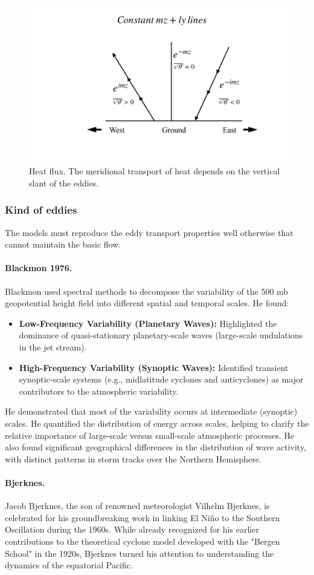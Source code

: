 \begin{figure}[htp!]
	\centering
	\includegraphics[width=0.5\linewidth]{uploads/Screenshot 2024-11-24 185505.png}
	\caption{Heat flux. The meridional transport of heat depends on the vertical slant of the eddies.}
	\label{fig:enter-label}
\end{figure}
\subsubsection{Kind of eddies}
The models must reproduce the eddy transport properties well otherwise that cannot maintain the basic flow.
\paragraph{Blackmon 1976.}\cite{Black76} Blackmon used spectral methods to decompose the variability of the 500 mb geopotential height field into different spatial and temporal scales. He found:
\begin{itemize}
	\item \textbf{Low-Frequency Variability (Planetary Waves):} Highlighted the dominance of quasi-stationary planetary-scale waves (large-scale undulations in the jet stream).
	\item \textbf{High-Frequency Variability (Synoptic Waves):} Identified transient synoptic-scale systems (e.g., midlatitude cyclones and anticyclones) as major contributors to the atmospheric variability.
\end{itemize}
He demonstrated that most of the variability occurs at intermediate (synoptic) scales. He quantified the distribution of energy across scales, helping to clarify the relative importance of large-scale versus small-scale atmospheric processes. He also found significant geographical differences in the distribution of wave activity, with distinct patterns in storm tracks over the Northern Hemisphere.

\paragraph{Bjerknes.} Jacob Bjerknes, the son of renowned meteorologist Vilhelm Bjerknes, is celebrated for his groundbreaking work in linking El Niño to the Southern Oscillation during the 1960s. While already recognized for his earlier contributions to the theoretical cyclone model developed with the "Bergen School" in the 1920s, Bjerknes turned his attention to understanding the dynamics of the equatorial Pacific.

